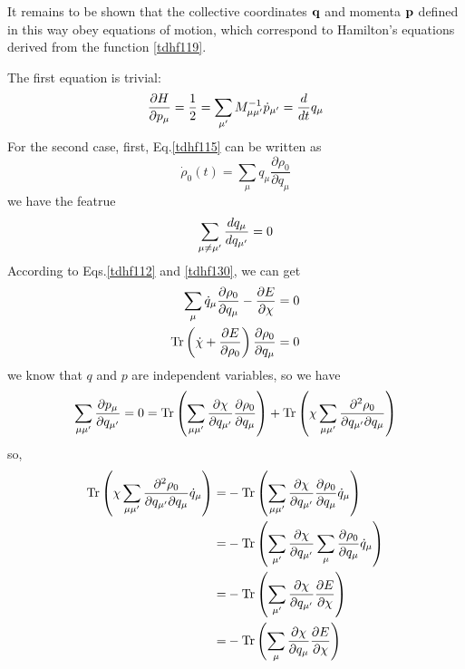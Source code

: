  It remains to be shown that the collective coordinates $\bf{q}$ and momenta $\bf{p}$ defined in this way obey equations of motion, which correspond to Hamilton's equations derived from the function \eqref{tdhf119}.

  The first equation is trivial:
  \begin{equation}
    \frac{\partial H}{\partial p_\mu} = \frac{1}{2} = \sum_{\mu^\prime} M^{-1}_{\mu\mu^{\prime}}\dot{p}_{\mu\rq} = \frac{d}{dt}q_\mu	 \label{tdhf129}
  \end{equation}
  For the second case, first, Eq.\eqref{tdhf115} can be written as
  \begin{equation}
    \dot{\rho}_0(t) = \sum_{\mu} q_{\mu} \frac{\partial \rho_0}{\partial q_{\mu}}	 \label{tdhf130}
  \end{equation}
  we have the featrue
  \begin{equation}
    \sum_{\mu \neq \mu\rq } \frac{dq_\mu}{d q_{\mu\rq}} = 0	 \label{tdhf131}
  \end{equation}
  According to Eqs.\eqref{tdhf112} and \eqref{tdhf130}, we can get
  \begin{subequations}
    \begin{align}
      \label{tdhf132a}\sum_{\mu} \dot{q}_{\mu} \frac{\partial \rho_0}{\partial q_{\mu}} - \frac{\partial E}{\partial\chi} = 0 \\ 
      \label{tdhf132b} {\rm Tr}\left( \dot{\chi} + \frac{\partial E}{\partial\rho_0} \right)\frac{\partial \rho_0}{\partial q_\mu} = 0
    \end{align}
  \end{subequations}
  we know that $q$ and $p$ are independent variables, so we have
  \begin{equation}
    \sum_{\mu\mu\rq} \frac{\partial p_\mu}{\partial q_{\mu\rq}} = 0 = {\rm Tr}\left( \sum_{\mu\mu\rq}\frac{\partial \chi}{\partial q_{\mu\rq}} \frac{\partial\rho_0}{\partial q_\mu} \right) + {\rm Tr}\left( \chi \sum_{\mu\mu\rq}\frac{\partial^2\rho_0}{\partial q_{\mu\rq} \partial q_{\mu}} \right)	 \label{tdhf133}
  \end{equation}
  so, 
  \begin{equation}
    \begin{aligned}
          {\rm Tr}\left( \chi \sum_{\mu\mu\rq}\frac{\partial^2\rho_0}{\partial q_{\mu\rq} \partial q_{\mu}} \dot{q}_\mu \right) =&  - {\rm Tr}\left( \sum_{\mu\mu\rq}\frac{\partial \chi}{\partial q_{\mu\rq}} \frac{\partial\rho_0}{\partial q_\mu}\dot{q}_\mu \right)\\ \label{tdhf134}
          =& - {\rm Tr}\left( \sum_{\mu\rq}\frac{\partial \chi}{\partial q_{\mu\rq}} \sum_{\mu} \frac{\partial\rho_0}{\partial q_\mu}\dot{q}_\mu \right)	\\
          =& - {\rm Tr}\left( \sum_{\mu\rq}\frac{\partial \chi}{\partial q_{\mu\rq}} \frac{\partial E}{\partial\chi}  \right) \\
          =& - {\rm Tr}\left( \sum_{\mu}\frac{\partial \chi}{\partial q_{\mu}} \frac{\partial E}{\partial\chi}  \right)
    \end{aligned}
  \end{equation}
